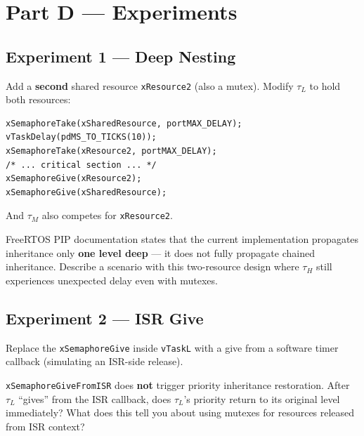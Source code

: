 \documentclass[11pt, a4paper]{article}
\begin{document}
\section{Part D --- Experiments}

\subsection{Experiment 1 --- Deep Nesting}

Add a \textbf{second} shared resource \texttt{xResource2} (also a mutex). Modify $\tau_L$
to hold both resources:

\begin{lstlisting}[style=cstyle]
xSemaphoreTake(xSharedResource, portMAX_DELAY);
vTaskDelay(pdMS_TO_TICKS(10));
xSemaphoreTake(xResource2, portMAX_DELAY);
/* ... critical section ... */
xSemaphoreGive(xResource2);
xSemaphoreGive(xSharedResource);
\end{lstlisting}

And $\tau_M$ also competes for \texttt{xResource2}.

\begin{questionbox}[~D1]
  FreeRTOS PIP documentation states that the current implementation propagates
  inheritance only \textbf{one level deep} --- it does not fully propagate chained
  inheritance. Describe a scenario with this two-resource design where $\tau_H$ still
  experiences unexpected delay even with mutexes.
\end{questionbox}

\subsection{Experiment 2 --- ISR Give}

Replace the \texttt{xSemaphoreGive} inside \texttt{vTaskL} with a give from a software
timer callback (simulating an ISR-side release).

\begin{questionbox}[~D2]
  \texttt{xSemaphoreGiveFromISR} does \textbf{not} trigger priority inheritance
  restoration. After $\tau_L$ ``gives'' from the ISR callback, does $\tau_L$'s priority
  return to its original level immediately? What does this tell you about using mutexes
  for resources released from ISR context?
\end{questionbox}

\end{document}
